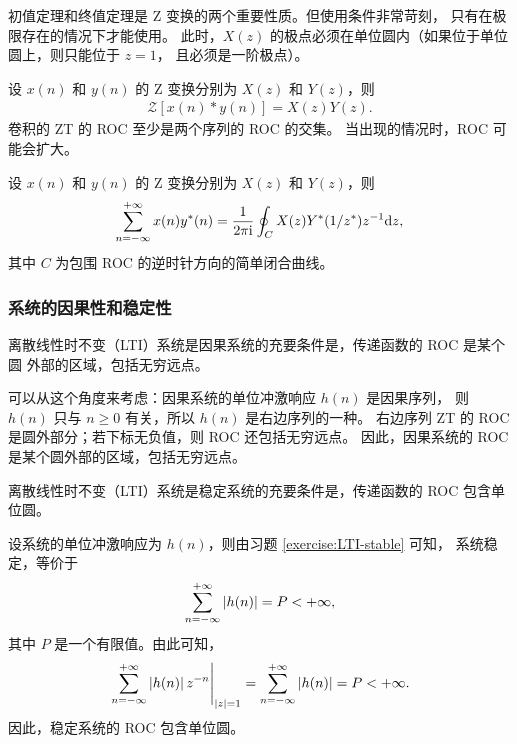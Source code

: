 \begin{remark}
    初值定理和终值定理是 Z 变换的两个重要性质。但使用条件非常苛刻，
    只有在极限存在的情况下才能使用。
    此时，$X(z)$ 的极点必须在单位圆内（如果位于单位圆上，则只能位于 $z = 1$，
    且必须是一阶极点）。
\end{remark}

\begin{property}[ZT 的时域卷积定理]
    设 $x(n)$ 和 $y(n)$ 的 Z 变换分别为 $X(z)$ 和 $Y(z)$，则
    \begin{align*}
        \mathcal{Z}[x(n) * y(n)] = X(z)Y(z).
    \end{align*}
    卷积的 ZT 的 ROC 至少是两个序列的 ROC 的交集。
    当出现的情况时，ROC 可能会扩大。
\end{property}

\begin{property}[ZT 的帕斯瓦尔定理]
    设 $x(n)$ 和 $y(n)$ 的 Z 变换分别为 $X(z)$ 和 $Y(z)$，则
    \begin{align*}
        \sum_{n=-\infty}^{+\infty} x(n)y^*(n) = \frac{1}{2\pi\mathrm{i}}\oint_C X(z)Y^*(1/z^*)z^{-1} \mathrm{d}z,
    \end{align*}
    其中 $C$ 为包围 ROC 的逆时针方向的简单闭合曲线。
\end{property}

\subsubsection{系统的因果性和稳定性}

\begin{theorem}[因果系统的充要条件]
    离散线性时不变（LTI）系统是因果系统的充要条件是，传递函数的 ROC 是某个圆
    外部的区域，包括无穷远点。
\end{theorem}

\begin{analysis}
    可以从这个角度来考虑：因果系统的单位冲激响应 $h(n)$ 是因果序列，
    则 $h(n)$ 只与 $n \ge 0$ 有关，所以 $h(n)$ 是右边序列的一种。
    右边序列 ZT 的 ROC 是圆外部分；若下标无负值，则 ROC 还包括无穷远点。
    因此，因果系统的 ROC 是某个圆外部的区域，包括无穷远点。
\end{analysis}

\begin{theorem}[稳定系统的充要条件]
    离散线性时不变（LTI）系统是稳定系统的充要条件是，传递函数的 ROC 包含单位圆。
\end{theorem}

\begin{analysis}
    设系统的单位冲激响应为 $h(n)$，则由习题 \ref{exercise:LTI-stable} 可知，
    系统稳定，等价于
    \begin{align*}
        \sum_{n = -\infty}^{+\infty} \left|h(n)\right| = P < +\infty,
    \end{align*}
    其中 $P$ 是一个有限值。由此可知，
    \begin{align*}
        \left.\sum_{n = -\infty}^{+\infty} \left|h(n)\right|z^{-n}\right|_{\left|z\right| = 1} = \sum_{n = -\infty}^{+\infty} \left|h(n)\right| = P < +\infty.
    \end{align*}
    因此，稳定系统的 ROC 包含单位圆。
\end{analysis}


